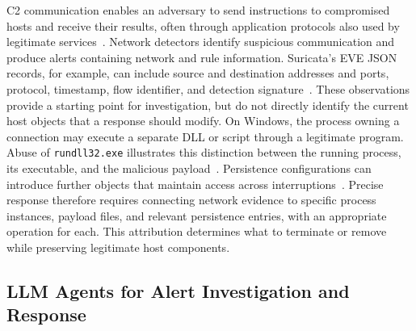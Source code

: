 \documentclass[pdflatex,sn-basic]{sn-jnl}
\begin{document}
C2 communication enables an adversary to send instructions to compromised hosts and receive their results, often through application protocols also used by legitimate services~\citep{mitre-c2}. Network detectors identify suspicious communication and produce alerts containing network and rule information. Suricata's EVE JSON records, for example, can include source and destination addresses and ports, protocol, timestamp, flow identifier, and detection signature~\citep{suricata-eve}. These observations provide a starting point for investigation, but do not directly identify the current host objects that a response should modify. On Windows, the process owning a connection may execute a separate DLL or script through a legitimate program. Abuse of \texttt{rundll32.exe} illustrates this distinction between the running process, its executable, and the malicious payload~\citep{mitre-rundll32}. Persistence configurations can introduce further objects that maintain access across interruptions~\citep{mitre-persistence}. Precise response therefore requires connecting network evidence to specific process instances, payload files, and relevant persistence entries, with an appropriate operation for each. This attribution determines what to terminate or remove while preserving legitimate host components.

\subsection{LLM Agents for Alert Investigation and Response}
\label{sec:background-llm}
\end{document}
